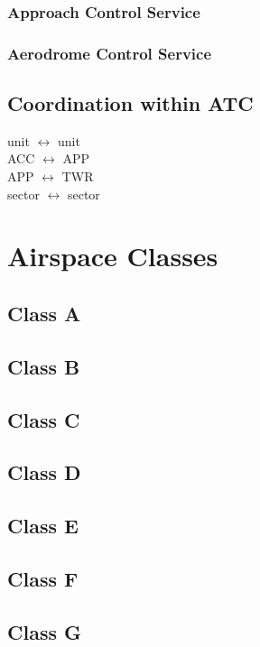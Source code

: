 \subsubsection{Approach Control Service}
\subsubsection{Aerodrome Control Service}
\subsection{Coordination within ATC}
unit $\leftrightarrow$ unit \\
ACC $\leftrightarrow$ APP \\
APP $\leftrightarrow$ TWR \\
sector $\leftrightarrow$ sector

\section{Airspace Classes}
\subsection{Class A}
\subsection{Class B}
\subsection{Class C}
\subsection{Class D}
\subsection{Class E}
\subsection{Class F}
\subsection{Class G}




